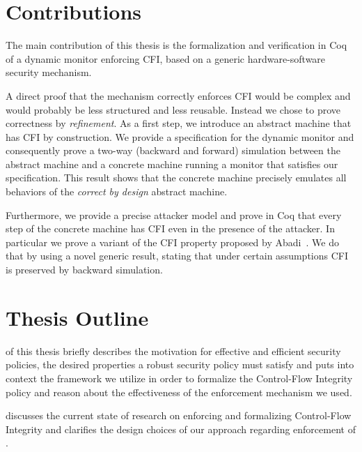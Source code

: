 \section{Contributions}\label{sec:contributions}

The main contribution of this thesis is the formalization and
verification in Coq of a dynamic monitor enforcing CFI, based on a
generic hardware-software security mechanism.

A direct proof that the mechanism correctly enforces CFI would be
complex and would probably be less structured and less
reusable. Instead we chose to prove correctness by
\emph{refinement}. As a first step, we introduce an abstract machine
that has CFI by construction. We provide a specification for the
dynamic monitor and consequently prove a two-way (backward and
forward) simulation between the abstract machine and a concrete
machine running a monitor that satisfies our specification. This
result shows that the concrete machine precisely emulates all
behaviors of the \emph{correct by design} abstract machine.

Furthermore, we provide a precise attacker model and prove in Coq that
every step of the concrete machine has CFI even in the presence of the
attacker. In particular we prove a variant of the CFI property
proposed by Abadi~\ETAL\cite{AbadiBEL09}.
%
We do that by using a novel generic result, stating
that under certain assumptions CFI is preserved by backward simulation.


\section{Thesis Outline}\label{sec:outline}
 of this thesis briefly describes the motivation for
effective and efficient security policies, the desired properties a
robust security policy must satisfy and puts into context the
framework we utilize in order to formalize the Control-Flow Integrity policy
and reason about the effectiveness of the enforcement mechanism we used.

 discusses the current state of
research on enforcing and formalizing Control-Flow Integrity and clarifies
the design choices of our approach regarding enforcement of \CFI.

